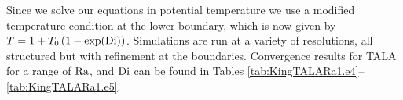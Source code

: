 %
%
%
%
Since we solve our equations in potential temperature we use a modified 
temperature condition at the lower boundary, which is now given 
by $T = 1 + T_0\left(1 - \exp(\mathrm{Di})\right)$.  Simulations are run at a
variety of resolutions, all structured but with refinement at the
boundaries.  Convergence results for TALA for a range of
$\mathrm{Ra}$, and $\mathrm{Di}$  can be found in Tables \ref{tab:KingTALARa1.e4}--\ref{tab:KingTALARa1.e5}.


